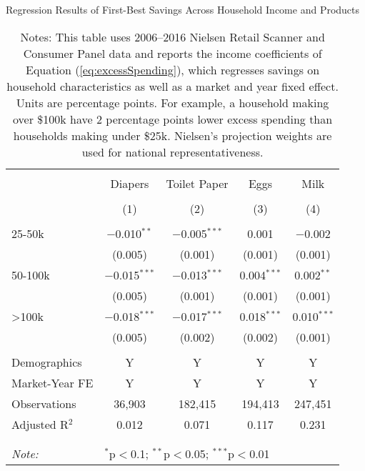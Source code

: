 
\begin{table}[!htbp] \centering
  \caption{Regression Results of First-Best Savings Across Household Income and Products}
  \label{tab:lowestPrice}
\begin{tabular}{@{\extracolsep{5pt}}lcccc}
\\[-1.8ex]\hline
\hline \\[-1.8ex]
 & Diapers & Toilet Paper & Eggs & Milk \\
\\[-1.8ex] & (1) & (2) & (3) & (4)\\
\hline \\[-1.8ex]
 25-50k & $-$0.010$^{**}$ & $-$0.005$^{***}$ & 0.001 & $-$0.002 \\
  & (0.005) & (0.001) & (0.001) & (0.001) \\
  50-100k & $-$0.015$^{***}$ & $-$0.013$^{***}$ & 0.004$^{***}$ & 0.002$^{**}$ \\
  & (0.005) & (0.001) & (0.001) & (0.001) \\
  >100k & $-$0.018$^{***}$ & $-$0.017$^{***}$ & 0.018$^{***}$ & 0.010$^{***}$ \\
  & (0.005) & (0.002) & (0.002) & (0.001) \\
 \hline \\[-1.8ex]
Demographics & Y & Y & Y & Y \\
Market-Year FE & Y & Y & Y & Y \\
Observations & 36,903 & 182,415 & 194,413 & 247,451 \\
Adjusted R$^{2}$ & 0.012 & 0.071 & 0.117 & 0.231 \\
\\[-1.8ex]\hline
\hline \\[-1.8ex]
\textit{Note:}  & \multicolumn{4}{l}{$^{*}$p$<$0.1; $^{**}$p$<$0.05; $^{***}$p$<$0.01} \\
\end{tabular}
\caption*{Notes: This table uses 2006--2016 Nielsen Retail Scanner and Consumer Panel data and reports the income coefficients of Equation (\ref{eq:excessSpending}), which regresses savings on household characteristics as well as a market and year fixed effect. Units are percentage points. For example, a household making over \$100k have 2 percentage points lower excess spending than households making under \$25k. Nielsen's projection weights are used for national representativeness.}
\end{table}
